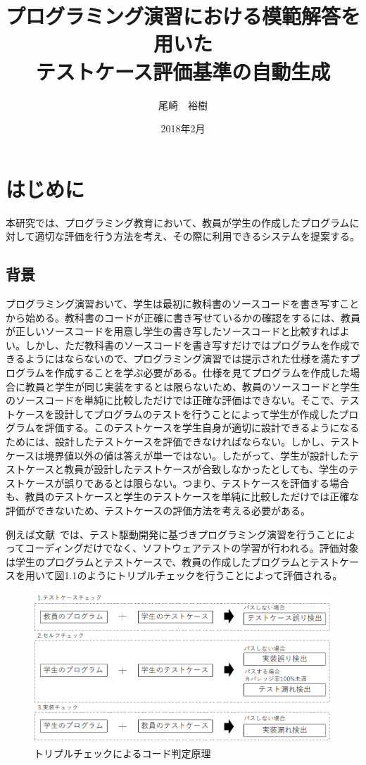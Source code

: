 \documentclass{tpu-sotu}
\author{尾崎　裕樹}
\title{プログラミング演習における模範解答を用いた\\テストケース評価基準の自動生成}
\date{2018年2月}
\begin{document}
%
\maketitle
\clearpage
{}
\tableofcontents
\clearpage
{}
%

%
\chapter{はじめに}
本研究では、プログラミング教育において、教員が学生の作成したプログラムに対して適切な評価を行う方法を考え、その際に利用できるシステムを提案する。
\section{背景}
プログラミング演習おいて、学生は最初に教科書のソースコードを書き写すことから始める。教科書のコードが正確に書き写せているかの確認をするには、教員が正しいソースコードを用意し学生の書き写したソースコードと比較すればよい。しかし、ただ教科書のソースコードを書き写すだけではプログラムを作成できるようにはならないので、プログラミング演習では提示された仕様を満たすプログラムを作成することを学ぶ必要がある。仕様を見てプログラムを作成した場合に教員と学生が同じ実装をするとは限らないため、教員のソースコードと学生のソースコードを単純に比較しただけでは正確な評価はできない。そこで、テストケースを設計してプログラムのテストを行うことによって学生が作成したプログラムを評価する。このテストケースを学生自身が適切に設計できるようになるためには、設計したテストケースを評価できなければならない。しかし、テストケースは境界値以外の値は答えが単一ではない。したがって、学生が設計したテストケースと教員が設計したテストケースが合致しなかったとしても、学生のテストケースが誤りであるとは限らない。つまり、テストケースを評価する場合も、教員のテストケースと学生のテストケースを単純に比較しただけでは正確な評価ができないため、テストケースの評価方法を考える必要がある。

例えば文献~\cite{a0}では、テスト駆動開発に基づきプログラミング演習を行うことによってコーディングだけでなく、ソフトウェアテストの学習が行われる。評価対象は学生のプログラムとテストケースで、教員の作成したプログラムとテストケースを用いて図1.1のようにトリプルチェックを行うことによって評価される。
\newpage
\begin{figure}[h]
  \centering
  \includegraphics[width=130mm]{トリプルチェック.png}
  \caption{トリプルチェックによるコード判定原理}
\end{figure}
\end{document}
